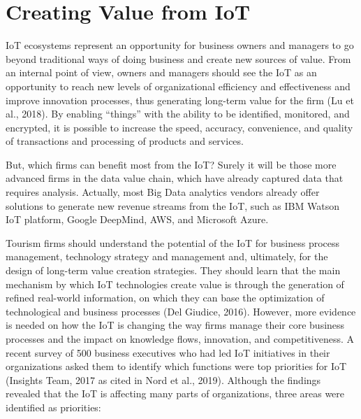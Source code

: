 \documentclass[
  letterpaper,
  DIV=11,
  numbers=noendperiod]{scrreprt}
\begin{document}
\hypertarget{creating-value-from-iot}{%
\section{Creating Value from IoT}\label{creating-value-from-iot}}

IoT ecosystems represent an opportunity for business owners and managers
to go beyond traditional ways of doing business and create new sources
of value. From an internal point of view, owners and managers should see
the IoT as an opportunity to reach new levels of organizational
efficiency and effectiveness and improve innovation processes, thus
generating long-term value for the firm (Lu et al., 2018). By enabling
``things'' with the ability to be identified, monitored, and encrypted,
it is possible to increase the speed, accuracy, convenience, and quality
of transactions and processing of products and services.

But, which firms can benefit most from the IoT? Surely it will be those
more advanced firms in the data value chain, which have already captured
data that requires analysis. Actually, most Big Data analytics vendors
already offer solutions to generate new revenue streams from the IoT,
such as IBM Watson IoT platform, Google DeepMind, AWS, and Microsoft
Azure.

Tourism firms should understand the potential of the IoT for business
process management, technology strategy and management and, ultimately,
for the design of long-term value creation strategies. They should learn
that the main mechanism by which IoT technologies create value is
through the generation of refined real-world information, on which they
can base the optimization of technological and business processes (Del
Giudice, 2016). However, more evidence is needed on how the IoT is
changing the way firms manage their core business processes and the
impact on knowledge flows, innovation, and competitiveness. A recent
survey of 500 business executives who had led IoT initiatives in their
organizations asked them to identify which functions were top priorities
for IoT (Insights Team, 2017 as cited in Nord et al., 2019). Although
the findings revealed that the IoT is affecting many parts of
organizations, three areas were identified as priorities:
\end{document}
